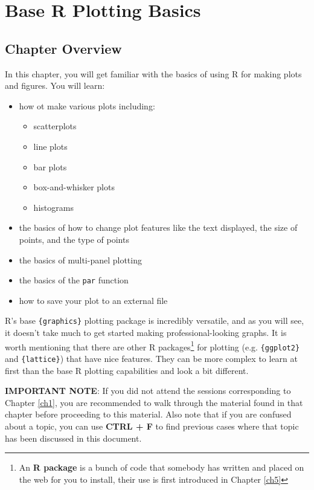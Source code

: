 \documentclass[]{book}
\providecommand{\tightlist}{%
  \setlength{\itemsep}{0pt}\setlength{\parskip}{0pt}}
\let\rmarkdownfootnote\footnote%
\def\footnote{\protect\rmarkdownfootnote}
\theoremstyle{definition}
\theoremstyle{definition}
\theoremstyle{definition}
\theoremstyle{remark}
\begin{document}
\chapter{Base R Plotting Basics}\label{ch2}

\section*{Chapter Overview}\label{chapter-overview-1}

In this chapter, you will get familiar with the basics of using R for
making plots and figures. You will learn:

\begin{itemize}
\tightlist
\item
  how ot make various plots including:

  \begin{itemize}
  \tightlist
  \item
    scatterplots
  \item
    line plots
  \item
    bar plots
  \item
    box-and-whisker plots
  \item
    histograms
  \end{itemize}
\item
  the basics of how to change plot features like the text displayed, the
  size of points, and the type of points
\item
  the basics of multi-panel plotting
\item
  the basics of the \texttt{par} function
\item
  how to save your plot to an external file
\end{itemize}

R's base \texttt{\{graphics\}} plotting package is incredibly versatile,
and as you will see, it doesn't take much to get started making
professional-looking graphs. It is worth mentioning that there are other
R packages\footnote{An \textbf{R package} is a bunch of code that
  somebody has written and placed on the web for you to install, their
  use is first introduced in Chapter \ref{ch5}} for plotting (e.g.
\texttt{\{ggplot2\}} and \texttt{\{lattice\}}) that have nice features.
They can be more complex to learn at first than the base R plotting
capabilities and look a bit different.

\textbf{IMPORTANT NOTE}: If you did not attend the sessions
corresponding to Chapter \ref{ch1}, you are recommended to walk through
the material found in that chapter before proceeding to this material.
Also note that if you are confused about a topic, you can use
\textbf{CTRL + F} to find previous cases where that topic has been
discussed in this document.
\end{document}
